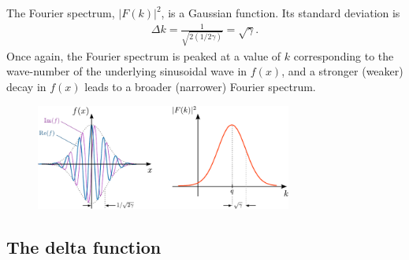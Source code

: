 \documentclass[10pt,a4paper]{article}
\begin{document}
The Fourier spectrum, $|F(k)|^2$, is a Gaussian function. Its standard
deviation is
\begin{align}
  \Delta k = \frac{1}{\sqrt{2(1/2\gamma)}} = \sqrt{\gamma}.
\end{align}
Once again, the Fourier spectrum is peaked at a value of $k$
corresponding to the wave-number of the underlying sinusoidal wave in
$f(x)$, and a stronger (weaker) decay in $f(x)$ leads to a broader
(narrower) Fourier spectrum.

\begin{figure}[h]
  \centering\includegraphics[width=0.75\textwidth]{fourier_example4}
\end{figure}

\subsection{The delta function}
\label{delta-function}
\end{document}
